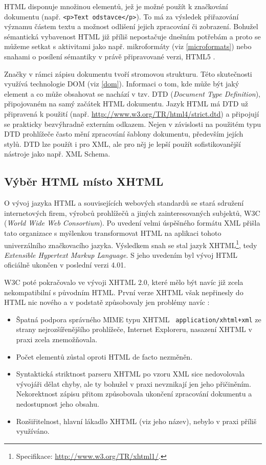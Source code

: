 HTML disponuje množinou elementů, jež je možné použít k značkování
dokumentu (např. {\tt <p>Text odstavce</p>}). To má za výsledek
přiřazování významu částem textu a možnost odlišení jejich zpracování
či zobrazení. Bohužel sémantická vybavenost HTML již příliš
nepostačuje dnešním potřebám a proto se můžeme setkat s aktivitami
jako např. mikroformáty (viz \ref{microformats}) nebo snahami o
posílení sémantiky v právě připravované verzi, HTML5 \cite{html5}.

Značky v rámci zápisu dokumentu tvoří stromovou strukturu. Této
skutečnosti využívá technologie DOM (viz \ref{dom}). Informaci
o tom, kde může být jaký element a co může obsahovat se nachází v
tzv. DTD ({\it Document Type Definition}), připojovaném na samý
začátek HTML dokumentu. Jazyk HTML má DTD už připravená k použití
(např. \url{http://www.w3.org/TR/html4/strict.dtd}) a připojují se
prakticky bezvýhradně externím odkazem. Nejen v závislosti na
použitém typu DTD prohlížeče často mění zpracování šablony dokumentu,
především jejích stylů. DTD lze použít i pro XML, ale pro něj je lepší
použít sofistikovanější nástroje jako např. XML Schema. 

\subsection{Výběr HTML místo XHTML}
O vývoj jazyka HTML a souvisejících webových standardů se stará
sdružení internetových firem, výrobců prohlížečů a jiných
zainteresovaných subjektů, W3C ({\it World Wide Web Consortium}). Po
uvedení velmi úspěšného formátu XML přišla tato organizace s
myšlenkou transformovat HTML na aplikaci tohoto univerzálního
značkovacího jazyka. Výsledkem snah se stal jazyk
XHTML\footnote{Specifikace: \url{http://www.w3.org/TR/xhtml1/}.}, tedy
{\it Extensible Hypertext Markup Language}. S jeho uvedením byl vývoj
 HTML oficiálně ukončen v poslední verzi 4.01.

W3C poté pokračovalo ve vývoji XHTML 2.0, které mělo být navíc již
zcela nekompatibilní s původním HTML. První verze XHTML však
nepřinesly do HTML nic nového a v podstatě způsobovaly jen problémy
navíc \cite{xhtml}:

\begin{itemize}
	\item Špatná podpora správného MIME typu XHTML {\tt
	application/xhtml+xml} ze strany nejrozšířenějšího prohlížeče,
	Internet Exploreru, nasazení  XHTML v praxi zcela
	znemožňovala.
	\item Počet elementů zůstal oproti HTML de facto nezměněn.
	\item Syntaktická striktnost parseru XHTML po vzoru XML sice
	nedovolovala vývojáři dělat chyby, ale ty bohužel v praxi nevznikají
	jen jeho přičiněním. Nekorektnost zápisu přitom způsobovala ukončení
	zpracování dokumentu a nedostupnost jeho obsahu.
	\item Rozšiřitelnost, hlavní lákadlo XHTML (viz jeho název), nebylo
	v praxi příliš využíváno. 
\end{itemize}

